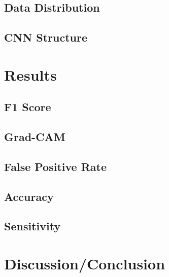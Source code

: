 \documentclass[acmsmall, review]{acmart}
\begin{document}
\subsection{Data Distribution}
\subsection{CNN Structure}


\section{Results}
\subsection{F1 Score}
\subsection{Grad-CAM}
\subsection{False Positive Rate}
\subsection{Accuracy}
\subsection{Sensitivity}
\section{Discussion/Conclusion}
\end{document}
